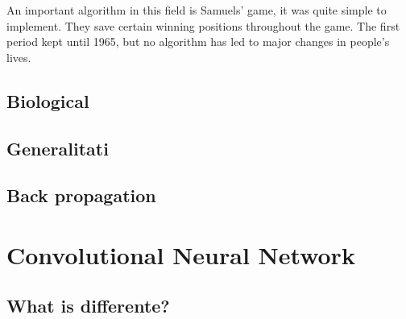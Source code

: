 An important algorithm in this field is Samuels' game, it was quite simple to implement. They save certain winning positions throughout the game.\cite{historyofneuronalnetwork}
The first period kept until 1965, but no algorithm has led to major changes in people's lives. \cite{historyofneuronalnetwork}
\subsection{Biological}
\subsection{Generalitati}
\subsection{Back propagation}

\section{Convolutional Neural Network}
\subsection{What is differente?}


